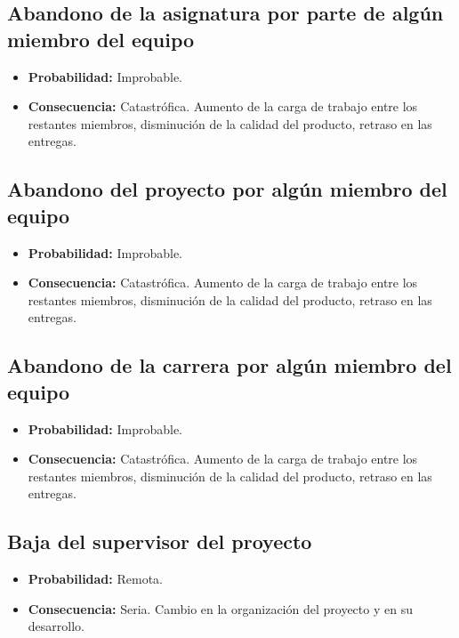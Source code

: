 \documentclass[spanish,a4paper,11pt, twoside]{report}	%
\begin{document}
	\subsection*{Abandono de la asignatura por parte de algún miembro del equipo}	
		\begin{itemize}
			\item \textbf {Probabilidad: }Improbable.
			\item \textbf {Consecuencia: }Catastrófica. Aumento de la carga de trabajo entre los restantes miembros, disminución de la calidad del producto, retraso en las entregas.
		\end{itemize}
	
	\subsection*{Abandono del proyecto por algún miembro del equipo}	
		\begin{itemize}
			\item \textbf {Probabilidad: }Improbable.
			\item \textbf {Consecuencia: }Catastrófica. Aumento de la carga de trabajo entre los restantes miembros, disminución de la calidad del producto, retraso en las entregas.
		\end{itemize}
	
	\subsection*{Abandono de la carrera por algún miembro del equipo}
		\begin{itemize}
			\item \textbf {Probabilidad: }Improbable.
			\item \textbf {Consecuencia: }Catastrófica. Aumento de la carga de trabajo entre los restantes miembros, disminución de la calidad del producto, retraso en las entregas.
		\end{itemize}
	
	\subsection*{Baja del supervisor del proyecto}
		\begin{itemize}
			\item \textbf {Probabilidad: }Remota.
			\item \textbf {Consecuencia: }Seria. Cambio en la organización del proyecto y en su desarrollo.
		\end{itemize}
\end{document}
